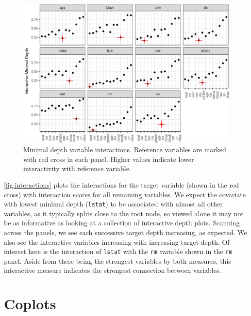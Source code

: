 \documentclass[article]{jss}
\begin{document}
\begin{CodeChunk}
\begin{figure}

{\centering \includegraphics{Regression-rfsrc_files/figure-latex/interactions-1} 

}

\caption[Minimal depth variable interactions]{Minimal depth variable interactions. Reference variables are marked with red cross in each panel. Higher values indicate lower interactivity with reference variable.}\label{fig:interactions}
\end{figure}
\end{CodeChunk}

\autoref{fig:interactions} plots the interactions for the target
variable (shown in the red cross) with interaction scores for all
remaining variables. We expect the covariate with lowest minimal depth
(\texttt{lstat}) to be associated with almost all other variables, as it
typically splits close to the root node, so viewed alone it may not be
as informative as looking at a collection of interactive depth plots.
Scanning across the panels, we see each successive target depth
increasing, as expected. We also see the interactive variables
increasing with increasing target depth. Of interest here is the
interaction of \texttt{lstat} with the \texttt{rm} variable shown in the
\texttt{rm} panel. Aside from these being the strongest variables by
both measures, this interactive measure indicates the strongest
connection between variables.

\hypertarget{coplots}{%
\section{Coplots}\label{coplots}}
\end{document}
